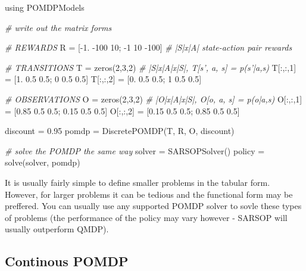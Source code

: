 \documentclass[12pt,]{article}
\newenvironment{Shaded}{}{}
\newcommand{\FloatTok}[1]{\textcolor[rgb]{0.25,0.63,0.44}{{#1}}}
\newcommand{\CommentTok}[1]{\textcolor[rgb]{0.38,0.63,0.69}{\textit{{#1}}}}
\newcommand{\NormalTok}[1]{{#1}}
\begin{document}
\begin{Shaded}
\begin{Highlighting}[]
\NormalTok{using POMDPModels}

\CommentTok{# write out the matrix forms}

\CommentTok{# REWARDS}
\NormalTok{R = [-}\FloatTok{1}\NormalTok{. -}\FloatTok{100} \FloatTok{10}\NormalTok{; -}\FloatTok{1} \FloatTok{10} \NormalTok{-}\FloatTok{100}\NormalTok{] }\CommentTok{# |S|x|A| state-action pair rewards}

\CommentTok{# TRANSITIONS}
\NormalTok{T = zeros(}\FloatTok{2}\NormalTok{,}\FloatTok{3}\NormalTok{,}\FloatTok{2}\NormalTok{) }\CommentTok{# |S|x|A|x|S|, T[s', a, s] = p(s'|a,s)}
\NormalTok{T[:,:,}\FloatTok{1}\NormalTok{] = [}\FloatTok{1}\NormalTok{. }\FloatTok{0.5} \FloatTok{0.5}\NormalTok{; }\FloatTok{0} \FloatTok{0.5} \FloatTok{0.5}\NormalTok{]}
\NormalTok{T[:,:,}\FloatTok{2}\NormalTok{] = [}\FloatTok{0}\NormalTok{. }\FloatTok{0.5} \FloatTok{0.5}\NormalTok{; }\FloatTok{1} \FloatTok{0.5} \FloatTok{0.5}\NormalTok{]}

\CommentTok{# OBSERVATIONS}
\NormalTok{O = zeros(}\FloatTok{2}\NormalTok{,}\FloatTok{3}\NormalTok{,}\FloatTok{2}\NormalTok{) }\CommentTok{# |O|x|A|x|S|, O[o, a, s] = p(o|a,s)}
\NormalTok{O[:,:,}\FloatTok{1}\NormalTok{] = [}\FloatTok{0.85} \FloatTok{0.5} \FloatTok{0.5}\NormalTok{; }\FloatTok{0.15} \FloatTok{0.5} \FloatTok{0.5}\NormalTok{]}
\NormalTok{O[:,:,}\FloatTok{2}\NormalTok{] = [}\FloatTok{0.15} \FloatTok{0.5} \FloatTok{0.5}\NormalTok{; }\FloatTok{0.85} \FloatTok{0.5} \FloatTok{0.5}\NormalTok{]}

\NormalTok{discount = }\FloatTok{0.95}
\NormalTok{pomdp = DiscretePOMDP(T, R, O, discount)}

\CommentTok{# solve the POMDP the same way}
\NormalTok{solver = SARSOPSolver()}
\NormalTok{policy = solve(solver, pomdp)}
\end{Highlighting}
\end{Shaded}

It is usually fairly simple to define smaller problems in the tabular
form. However, for larger problems it can be tedious and the functional
form may be preffered. You can usually use any supported POMDP solver to
sovle these types of problems (the performance of the policy may vary
however - SARSOP will usually outperform QMDP).

\subsection{Continous POMDP}\label{continous-pomdp}
\end{document}
